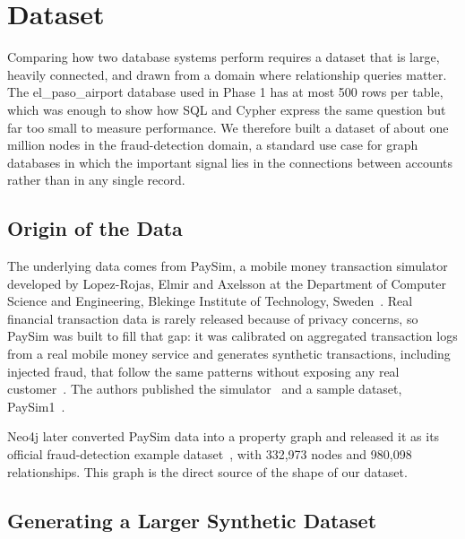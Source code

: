 
\section{Dataset}\label{sec:dataset}

Comparing how two database systems perform requires a dataset that is large, heavily connected, and drawn from a domain where relationship queries matter. The el\_paso\_airport database used in Phase 1 has at most 500 rows per table, which was enough to show how SQL and Cypher express the same question but far too small to measure performance. We therefore built a dataset of about one million nodes in the fraud-detection domain, a standard use case for graph databases in which the important signal lies in the connections between accounts rather than in any single record.

\subsection{Origin of the Data}

The underlying data comes from PaySim, a mobile money transaction simulator developed by Lopez-Rojas, Elmir and Axelsson at the Department of Computer Science and Engineering, Blekinge Institute of Technology, Sweden~\cite{lopezrojas2016paysim,lopezrojas2016applying,elmir2016paysim}. Real financial transaction data is rarely released because of privacy concerns, so PaySim was built to fill that gap: it was calibrated on aggregated transaction logs from a real mobile money service and generates synthetic transactions, including injected fraud, that follow the same patterns without exposing any real customer~\cite{elmir2016paysim}. The authors published the simulator~\cite{lopezrojas2026paysimcode} and a sample dataset, PaySim1~\cite{lopezrojas2026paysimkaggle}.

Neo4j later converted PaySim data into a property graph and released it as its official fraud-detection example dataset~\cite{neo4j2026frauddetection}, with 332,973 nodes and 980,098 relationships. This graph is the direct source of the shape of our dataset.

\subsection{Generating a Larger Synthetic Dataset}

